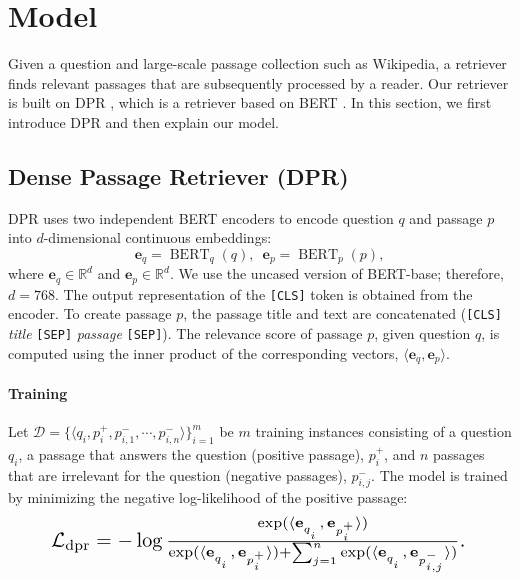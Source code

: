 \documentclass[11pt,a4paper]{article}
\DeclareMathOperator{\bert}{BERT}
\begin{document}
\section{Model}
Given a question and large-scale passage collection such as Wikipedia, a retriever finds relevant passages that are subsequently processed by a reader.
Our retriever is built on DPR \citep{Karpukhin2020DenseAnswering}, which is a retriever based on BERT \cite{devlin2018bert}.
In this section, we first introduce DPR and then explain our model.

\subsection{Dense Passage Retriever (DPR)}

DPR uses two independent BERT encoders to encode question $q$ and passage $p$ into $d$-dimensional continuous embeddings:
\begin{equation}
  \mathbf{e}_q = \bert_{q}(q),\,\,\, \mathbf{e}_p = \bert_{p}(p),
\end{equation}
where $\mathbf{e}_q \in \mathbb{R}^d$ and $\mathbf{e}_p \in \mathbb{R}^d$.
We use the uncased version of BERT-base; therefore, $d=768$.
The output representation of the \texttt{[CLS]} token is obtained from the encoder.
To create passage $p$, the passage title and text are concatenated (\texttt{[CLS]} \textit{title} \texttt{[SEP]} \textit{passage} \texttt{[SEP]}).
The relevance score of passage $p$, given question $q$, is computed using the inner product of the corresponding vectors, $\langle \mathbf{e}_q, \mathbf{e}_p \rangle$.

\paragraph{Training}
Let $\mathcal{D} = \{ \langle q_i, p^+_i, p^-_{i,1}, \cdots, p^-_{i,n} \rangle \}_{i=1}^m$ be $m$ training instances consisting of a question $q_i$, a passage that answers the question (positive passage), $p^+_i$, and $n$ passages that are irrelevant for the question (negative passages), $p^-_{i,j}$.
The model is trained by minimizing the negative log-likelihood of the positive passage:
\begin{equation}
  \resizebox{.89\hsize}{!}{
  $\mathcal{L}_{\text{dpr}} = -\log \frac{\exp(\langle \mathbf{e}_{q_i^{\phantom{0}}},\, \mathbf{e}_{p_i^+}\rangle)}{\exp(\langle \mathbf{e}_{q^{\phantom{0}}_i},\, \mathbf{e}_{p_i^+}\rangle) + \sum_{j=1}^n{\exp(\langle \mathbf{e}_{q^{\phantom{0}}_i},\, \mathbf{e}_{p^-_{i,j}}\rangle)}}$.
  }
  \label{eq:nll-loss}
\end{equation}
\end{document}
